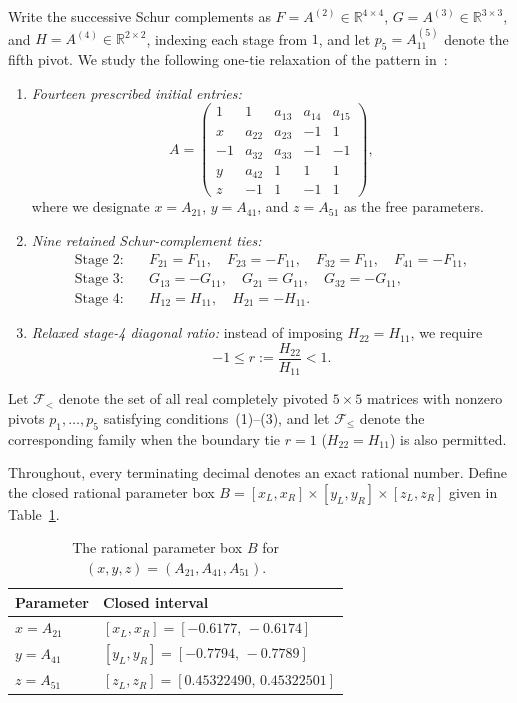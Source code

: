 \documentclass[11pt]{article}
\theoremstyle{remark}
\begin{document}
Write the successive Schur complements as $F = A^{(2)}\in\mathbb{R}^{4\times 4}$,
$G = A^{(3)}\in\mathbb{R}^{3\times 3}$, and $H = A^{(4)}\in\mathbb{R}^{2\times 2}$,
indexing each stage from $1$, and let $p_5 = A^{(5)}_{11}$ denote the fifth
pivot. We study the following one-tie relaxation of the pattern
in~\cite[eq.~(2.1)]{CEU2026}:
\begin{enumerate}
  \item \emph{Fourteen prescribed initial entries:}
  \begin{equation}\label{eq:template}
  A = \begin{pmatrix}
    1 & 1 & a_{13} & a_{14} & a_{15} \\
    x & a_{22} & a_{23} & -1 & 1 \\
    -1 & a_{32} & a_{33} & -1 & -1 \\
    y & a_{42} & 1 & 1 & 1 \\
    z & -1 & 1 & -1 & 1
  \end{pmatrix},
  \end{equation}
  where we designate $x=A_{21}$, $y=A_{41}$, and $z=A_{51}$ as the free
  parameters.
  \item \emph{Nine retained Schur-complement ties:}
  \begin{align*}
    \text{Stage 2:}\quad & F_{21}=F_{11},\quad F_{23}=-F_{11},\quad
                           F_{32}=F_{11},\quad F_{41}=-F_{11}, \\
    \text{Stage 3:}\quad & G_{13}=-G_{11},\quad G_{21}=G_{11},\quad
                           G_{32}=-G_{11}, \\
    \text{Stage 4:}\quad & H_{12}=H_{11},\quad H_{21}=-H_{11}.
  \end{align*}
  \item \emph{Relaxed stage-4 diagonal ratio:} instead of imposing
  $H_{22}=H_{11}$, we require
  \[
    -1 \le r := \frac{H_{22}}{H_{11}} < 1.
  \]
\end{enumerate}
Let $\mathcal{F}_{<}$ denote the set of all real completely pivoted $5\times 5$
matrices with nonzero pivots $p_1,\dots,p_5$ satisfying conditions~(1)--(3),
and let $\mathcal{F}_{\le}$ denote the corresponding family when the boundary
tie $r=1$ ($H_{22}=H_{11}$) is also permitted.

Throughout, every terminating decimal denotes an exact rational number. Define
the closed rational parameter box $B = [x_L,x_R]\times[y_L,y_R]\times[z_L,z_R]$
given in Table~\ref{tab:box}.

\begin{table}[htbp]
\centering
\caption{The rational parameter box $B$ for $(x,y,z)=(A_{21},A_{41},A_{51})$.}
\label{tab:box}
\begin{tabular}{@{}ll@{}}
\toprule
Parameter & Closed interval \\
\midrule
$x = A_{21}$ & $[x_L, x_R] = [-0.6177,\, -0.6174]$ \\
$y = A_{41}$ & $[y_L, y_R] = [-0.7794,\, -0.7789]$ \\
$z = A_{51}$ & $[z_L, z_R] = [0.45322490,\, 0.45322501]$ \\
\bottomrule
\end{tabular}
\end{table}
\end{document}

